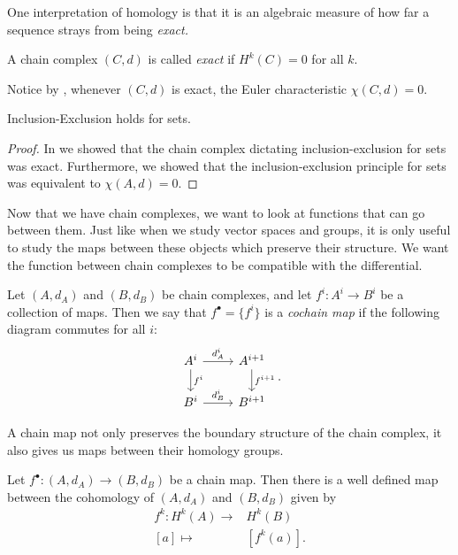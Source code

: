 One interpretation of homology is that it is an algebraic measure of how far a sequence strays from being \emph{exact.} \label{append:chaincones}
\begin{definition}
A chain complex $(C, d)$ is called \emph{exact} if $H^k(C)=0$ for all $k$. \label{def:exactsequence} 
\end{definition}
Notice by , whenever $(C, d)$ is exact, the Euler characteristic  $\chi(C, d)=0$. 
\begin{corollary}
	Inclusion-Exclusion holds for sets. 
\end{corollary}
\begin{proof}
	In  we showed that the chain complex dictating inclusion-exclusion for sets was exact. Furthermore, we showed that the inclusion-exclusion principle for sets was equivalent to $\chi(A, d)=0$. 
\end{proof}
\begin{elevator}
	
\end{elevator}
Now that we have chain complexes, we want to look at functions that can go between them. Just like when we study vector spaces and groups, it is only useful to study the maps between these objects which preserve their structure. We want the function between chain complexes to be compatible with the differential.
\begin{definition} \label{def:chainmap} 
	Let $( A,d_A)$ and $( B, d_B)$ be chain complexes, and let $f^i:A^i\to B^i$ be a collection of maps. Then we say that $f^\bullet=\{f^i\}$ is a \emph{cochain map} if the following diagram commutes for all $i$:
\[\begin{tikzcd}
	A^i\arrow{r}{d^i_A}\arrow{d}{f^i}&A^{i+1}\arrow{d}{f^{i+1}}\\ B^i\arrow{r}{d^i_B} &B^{i+1} 
\end{tikzcd}.\] 
\end{definition} 
A chain map not only preserves the boundary structure of the chain complex, it also gives us maps between their homology groups. 
\begin{claim}
Let $f^\bullet:(A, d_A)\to (B, d_B)$ be a chain map. Then there is a well defined map between the cohomology of $(A, d_A)$ and $(B, d_B)$ given by 
\begin{align*}
f^k: H^k(A)\to& H^k(B)\\
[a]\mapsto& [f^k(a)]. 
\end{align*}
\end{claim}
